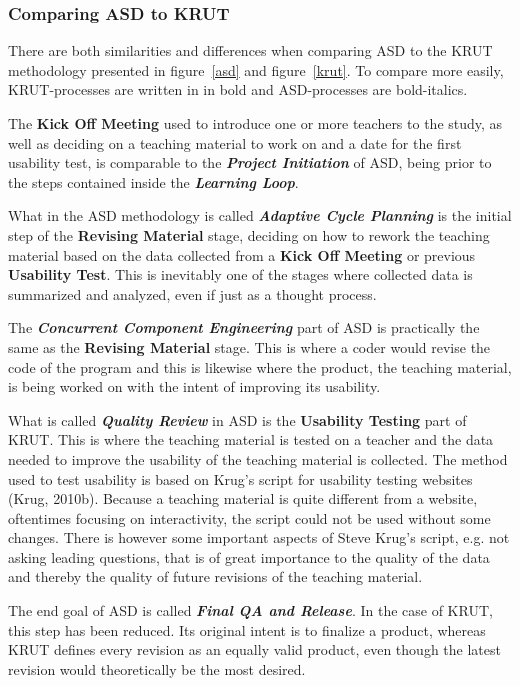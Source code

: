 \subsubsection*{Comparing ASD to KRUT}
There are both similarities and differences when comparing ASD to the KRUT methodology presented in figure~\ref{asd} and figure~\ref{krut}. To compare more easily, KRUT-processes are written in in bold and ASD-processes are bold-italics. 

The \textbf{Kick Off Meeting} used to introduce one or more teachers to the study, as well as deciding on a teaching material to work on and a date for the first usability test, is comparable to the \textbf{\textit{Project Initiation}} of ASD, being prior to the steps contained inside the \textbf{\textit{Learning Loop}}.

What in the ASD methodology is called \textbf{\textit{Adaptive Cycle Planning}} is the initial step of the \textbf{Revising Material} stage, deciding on how to rework the teaching material based on the data collected from a \textbf{Kick Off Meeting} or previous \textbf{Usability Test}. This is inevitably one of the stages where collected data is summarized and analyzed, even if just as a thought process.

The \textbf{\textit{Concurrent Component Engineering}} part of ASD is practically the same as the \textbf{Revising Material} stage. This is where a coder would revise the code of the program and this is likewise where the product, the teaching material, is being worked on with the intent of improving its usability.

What is called \textbf{\textit{Quality Review}} in ASD is the \textbf{Usability Testing} part of KRUT. This is where the teaching material is tested on a teacher and the data needed to improve the usability of the teaching material is collected. The method used to test usability is based on Krug’s script for usability testing websites (Krug, 2010b). Because a teaching material is quite different from a website, oftentimes focusing on interactivity, the script could not be used without some changes. There is however some important aspects of Steve Krug’s script, e.g. not asking leading questions, that is of great importance to the quality of the data and thereby the quality of future revisions of the teaching material.

The end goal of ASD is called \textbf{\textit{Final QA and Release}}. In the case of KRUT, this step has been reduced. Its original intent is to finalize a product, whereas KRUT defines every revision as an equally valid product, even though the latest revision would theoretically be the most desired.

